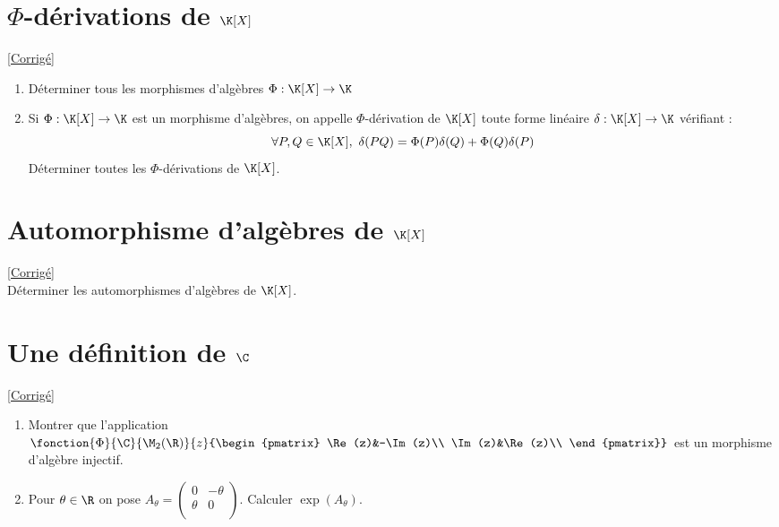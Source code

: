 \documentclass[8pt]{book}
\begin{document}
	\section{$\Phi$-dérivations de $\K[X]$ }
	\label{Phi-dérivations des polynômes}
	\textcolor{blue}{\hyperref[Phi-dérivations des polynômes corrigé]{[Corrigé]}}\\
	\begin{enumerate}[leftmargin=*]
		\item Déterminer tous les morphismes d'algèbres $\Phi:\K[X]\to \K$
		\item Si $\Phi:\K[X]\to \K$ est un morphisme d'algèbres, on appelle $\Phi$-dérivation de $\K[X]$ toute forme linéaire $\delta:\K[X]\to\K$ vérifiant :
		$$\forall P,Q\in \K[X],\ \delta(PQ)=\Phi(P)\delta(Q)+\Phi(Q)\delta(P)$$
		Déterminer toutes les $\Phi$-dérivations de $\K[X]$.
	\end{enumerate}
	
	\section{Automorphisme d'algèbres de $\K[X]$}
	\label{Automorphisme d'algèbres des polynômes}
	\textcolor{blue}{\hyperref[Automorphisme d'algèbres des polynômes corrigé]{[Corrigé]}}\\
	Déterminer les automorphismes d'algèbres de $\K[X]$.
	
	\section{Une définition de $\C$ }
	\label{Une définition de C}
	\textcolor{blue}{\hyperref[Une définition de C corrigé]{[Corrigé]}}\\
	\begin{enumerate}[leftmargin=*]
		\item Montrer que l'application $\fonction{\Phi}{\C}{\M_2(\R)}{z}{\begin{pmatrix}
				\Re(z)&-\Im(z)\\
				\Im(z)&\Re(z)\\
		\end{pmatrix}}$
		est un morphisme d'algèbre injectif.
		\item Pour $\theta\in \R$ on pose $A_\theta=
		\begin{pmatrix}
			0&-\theta\\
			\theta&0\\
		\end{pmatrix}$.
		Calculer $\exp{(A_\theta)}$.
	\end{enumerate}
	
\end{document}
